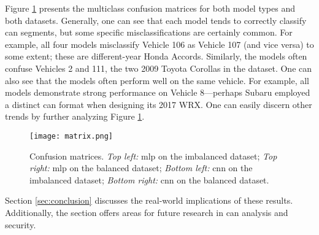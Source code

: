 \documentclass[../main.tex]{subfiles}
\begin{document}

Figure \ref{fig:matrix} presents the multiclass confusion matrices for both model types and both datasets. Generally, one can see that each model tends to correctly classify \ac{can} segments, but some specific misclassifications are certainly common. For example, all four models misclassify Vehicle 106 as Vehicle 107 (and vice versa) to some extent; these are different-year Honda Accords. Similarly, the models often confuse Vehicles 2 and 111, the two 2009 Toyota Corollas in the dataset. One can also see that the models often perform well on the same vehicle. For example, all models demonstrate strong performance on Vehicle 8---perhaps Subaru employed a distinct \ac{can} format when designing its 2017 WRX. One can easily discern other trends by further analyzing Figure \ref{fig:matrix}.

\begin{figure}
    \centerline{\texttt{[image: matrix.png]}}
    \caption{Confusion matrices. \textit{Top left:} \acl{mlp} on the imbalanced dataset; \textit{Top right:} \acl{mlp} on the balanced dataset; \textit{Bottom left:} \acl{cnn} on the imbalanced dataset; \textit{Bottom right:} \acl{cnn} on the balanced dataset.}
    \label{fig:matrix}
\end{figure}

Section \ref{sec:conclusion} discusses the real-world implications of these results. Additionally, the section offers areas for future research in \ac{can} analysis and security.
\end{document}

